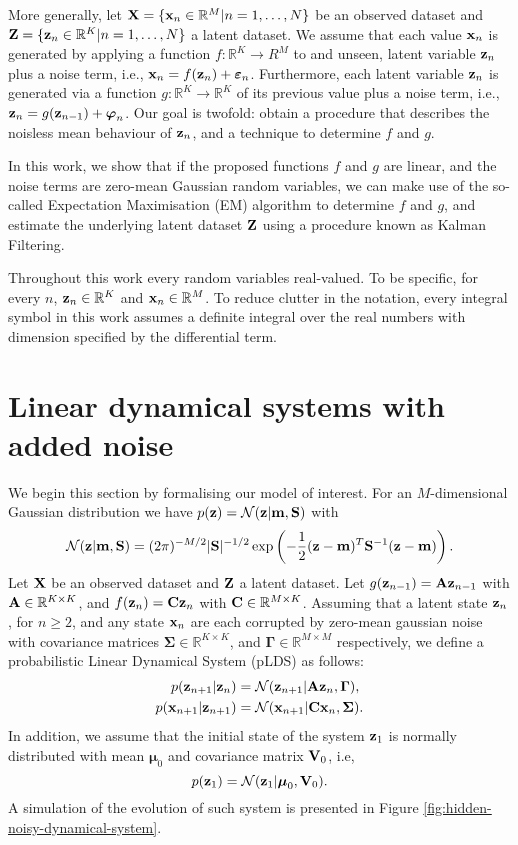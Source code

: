 \documentclass[11pt]{article}
\numberwithin{equation}{section}
\newcommand{\x}{{\bf x}}
\newcommand{\X}{{\bf X}}
\newcommand{\z}{{\bf z}}
\newcommand{\Z}{{\bf Z}}
\newcommand{\N}{\mathcal{N}}
\newcommand{\R}{\mathbb{R}}
\begin{document}
More generally, let $\X = \{\x_n \in \mathbb{R}^M \vert n=1,\ldots, N\}$ be an observed dataset and $\Z =  \{\z_n \in \mathbb{R}^K \vert n=1,\ldots, N\}$ a latent dataset. We assume that each value $\x_n$ is generated by applying a function $f:\R^K\to R^M$ to and unseen, latent variable $\z_n$ plus a noise term, i.e., $\x_n = f(\z_n) + \boldsymbol\varepsilon_n$. Furthermore, each latent variable $\z_n$ is generated via a function $g:\R^K\to\R^K$ of its previous value plus a noise term, i.e., $\z_n = g(\z_{n-1}) + \boldsymbol{\varphi}_n$. Our goal is twofold: obtain a procedure that describes the noisless mean behaviour of $\z_n$, and a technique to determine $f$ and $g$.

In this work, we show that if the proposed functions $f$ and $g$ are linear, and the noise terms are zero-mean Gaussian random variables, we can make use of the so-called Expectation Maximisation (EM) algorithm to determine $f$ and $g$, and estimate the underlying latent dataset $\Z$ using a procedure known as Kalman Filtering.

Throughout this work every random variables real-valued. To be specific, for every $n$, $\z_n \in \R^K$ and $\x_n \in \R^M$. To reduce clutter in the notation, every integral  symbol in this work assumes a definite integral over the real numbers with dimension specified by the differential term.

\section{Linear dynamical systems with added noise}
We begin this section by formalising our model of interest. For an $M$-dimensional Gaussian distribution we have $p(\z) = \mathcal{N}(\z \vert {\bf m}, {\bf S})$ with
\begin{equation}
	\N(\z \vert {\bf m}, {\bf S}) = (2\pi)^{-M/2} \vert {\bf S}\vert^{-1/2}\exp\left(-\frac{1}{2}(\z - {\bf m})^T{\bf S}^{-1}(\z - {\bf m})\right).
\end{equation}
Let $\X$ be an observed dataset and $\Z$ a latent dataset. Let $g(\z_{n-1}) = {\bf A} \z_{n-1}$ with ${\bf A}\in\R^{K\times K}$, and $f(\z_n) = {\bf C} \z_{n}$ with ${\bf C} \in \R^{M \times K}$. 
Assuming that a latent state $\z_n$, for $n \geq 2$, and any state $\x_n$ are each corrupted by zero-mean gaussian noise with covariance matrices $\boldsymbol{\Sigma} \in \mathbb{R}^{K \times K}$, and $\boldsymbol{\Gamma} \in \mathbb{R}^{M \times M}$ respectively, we define a  probabilistic Linear Dynamical System (pLDS) as follows:
\begin{align}
	p(\z_{n+1} \vert \z_n) &= \N(\z_{n+1} \vert {\bf A}\z_n, \boldsymbol\Gamma),\\
	p(\x_{n+1} \vert \z_{n+1}) &= \N(\x_{n+1} \vert {\bf C}\x_n, \boldsymbol\Sigma).
\end{align}
In addition, we assume that the initial state of the system $\z_1$ is normally distributed with mean $\boldsymbol{\mu}_0$ and covariance matrix ${\bf V}_0$, i.e,
\begin{equation}
	p(\z_1) = \N(\z_1 \vert \boldsymbol\mu_0, {\bf V}_0).
\end{equation}
A simulation of the evolution of such system is presented in Figure \ref{fig:hidden-noisy-dynamical-system}.
\end{document}
